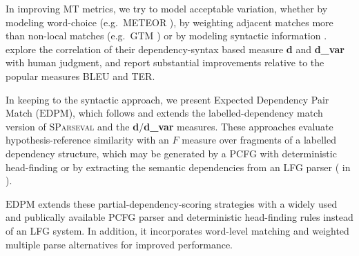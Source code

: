 \documentclass[11pt]{article}
\newcommand{\myEDPM}[0]{\ensuremath{\mathrm{EDPM}}}
\begin{document}
In improving MT metrics, we try to model acceptable variation, whether
by modeling word-choice (e.g.\ METEOR \cite{banerjee05meteor}), by weighting adjacent
matches more than non-local matches (e.g.\ GTM \cite{turian03mteval})
or by modeling syntactic information \cite{liu05syntaxformteval}.
 explore the correlation of their
dependency-syntax based measure \textbf{d} and \textbf{d\_var} with
human judgment, and report substantial improvements relative to the
popular measures BLEU and TER.

In keeping to the syntactic approach, we present Expected Dependency
Pair Match (\myEDPM{}), which follows and extends
the labelled-dependency match version of \textsc{SParseval}
\cite{roark06:sparseval} and the \textbf{d}/\textbf{d\_var}
\cite{owczarzak07labelleddepseval} measures. These approaches evaluate
hypothesis-reference similarity with an $F$ measure over fragments of
a labelled dependency structure, which may be generated by a PCFG with
deterministic head-finding
\cite{liu05syntaxformteval,roark06:sparseval} or by extracting the
semantic dependencies from an LFG parser ( in
).  

\myEDPM{} extends these partial-dependency-scoring strategies with a widely
used and publically available PCFG parser and deterministic
head-finding rules instead of an LFG system. In addition, it
incorporates word-level matching and weighted multiple parse
alternatives for improved performance.
\end{document}
